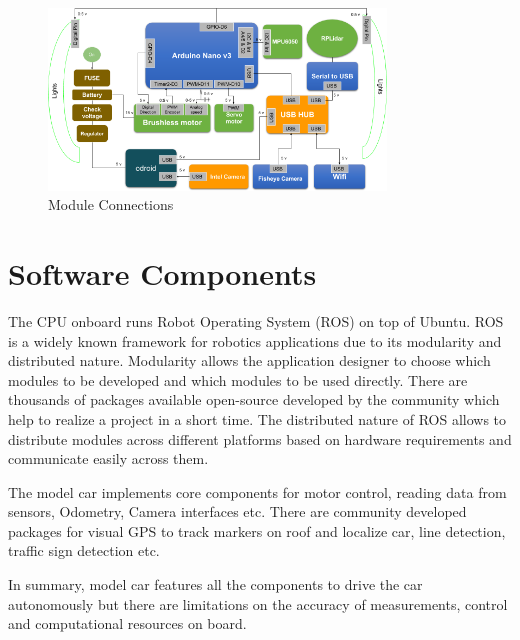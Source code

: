 \begin{figure}
	\centering
	\includegraphics[width=0.8\textwidth]{Images/platform/hardware_Connections.png}
	\caption{Module Connections}
	\label{moduleconnections}
\end{figure}

\section{Software Components}
The CPU onboard runs Robot Operating System (ROS) on top of Ubuntu. ROS is a widely known framework for robotics applications due to its modularity and distributed nature. Modularity allows the application designer to choose which modules to be developed and which modules to be used directly. There are thousands of packages available open-source developed by the community which help to realize a project in a short time. The distributed nature of ROS allows to distribute modules across different platforms based on hardware requirements and communicate easily across them.

The model car implements core components for motor control, reading data from sensors, Odometry, Camera interfaces etc. There are community developed packages for visual GPS to track markers on roof and localize car, line detection, traffic sign detection etc.

In summary, model car features all the components to drive the car autonomously but there are limitations on the accuracy  of measurements, control and computational resources on board. 

